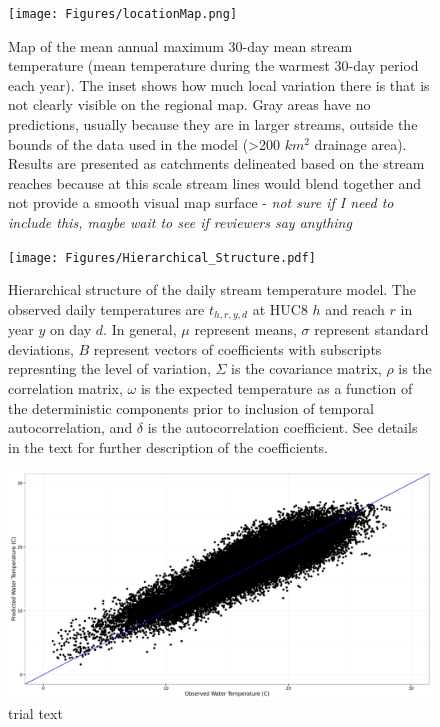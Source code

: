 \documentclass[12pt,]{article}
\date{}
\begin{document}
\begin{figure}[htbp]
\centering
\texttt{[image: Figures/locationMap.png]}
\caption{Map of the mean annual maximum 30-day mean stream temperature
(mean temperature during the warmest 30-day period each year). The inset
shows how much local variation there is that is not clearly visible on
the regional map. Gray areas have no predictions, usually because they
are in larger streams, outside the bounds of the data used in the model
(\textgreater{}200 \(km^2\) drainage area). Results are presented as
catchments delineated based on the stream reaches because at this scale
stream lines would blend together and not provide a smooth visual map
surface - \emph{not sure if I need to include this, maybe wait to see if
reviewers say anything}}
\end{figure}

\begin{figure}[htbp]
\centering
\texttt{[image: Figures/Hierarchical\_Structure.pdf]}
\caption{Hierarchical structure of the daily stream temperature model.
The observed daily temperatures are \(t_{h,r,y,d}\) at HUC8 \(h\) and
reach \(r\) in year \(y\) on day \(d\). In general, \(\mu\) represent
means, \(\sigma\) represent standard deviations, \(B\) represent vectors
of coefficients with subscripts represnting the level of variation,
\(\Sigma\) is the covariance matrix, \(\rho\) is the correlation matrix,
\(\omega\) is the expected temperature as a function of the
deterministic components prior to inclusion of temporal autocorrelation,
and \(\delta\) is the autocorrelation coefficient. See details in the
text for further description of the coefficients.}
\end{figure}

\begin{figure}[htbp]
\centering
\includegraphics{Figures/validation_plot.jpg}
\caption{trial text}
\end{figure}
\end{document}
